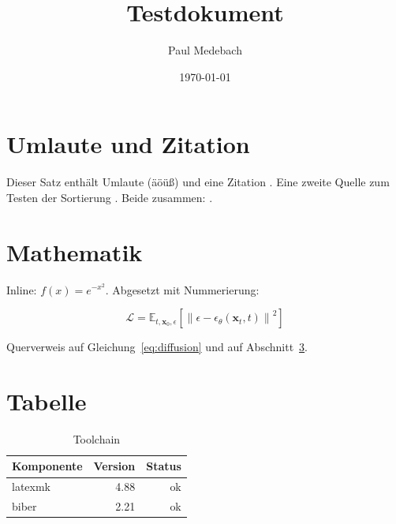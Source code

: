 \documentclass[11pt,a4paper]{article}
\title{Testdokument}
\author{Paul Medebach}
\date{\today}
\begin{document}
\maketitle

\section{Umlaute und Zitation}

Dieser Satz enthält Umlaute (äöüß) und eine Zitation \cite{mueller2024}.
Eine zweite Quelle zum Testen der Sortierung \cite{wang2024}.
Beide zusammen: \cite{mueller2024,wang2024}.

\section{Mathematik}

Inline: $f(x) = e^{-x^2}$. Abgesetzt mit Nummerierung:

\begin{equation}
    \mathcal{L} = \mathbb{E}_{t,\mathbf{x}_0,\epsilon}
    \left[ \left\| \epsilon - \epsilon_\theta(\mathbf{x}_t, t) \right\|^2 \right]
    \label{eq:diffusion}
\end{equation}

Querverweis auf Gleichung~\eqref{eq:diffusion} und auf
Abschnitt~\ref{sec:tabelle}.

\section{Tabelle}
\label{sec:tabelle}

\begin{table}[h]
    \centering
    \begin{tabular}{lrr}
        \hline
        Komponente & Version & Status \\
        \hline
        latexmk & 4.88 & ok \\
        biber   & 2.21 & ok \\
        \hline
    \end{tabular}
    \caption{Toolchain}
\end{table}

\printbibliography
\end{document}
